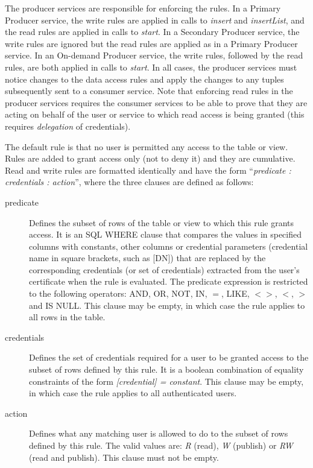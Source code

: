 The producer services are responsible for enforcing the rules. In a Primary
Producer service, the write rules are applied in calls to \textit{insert} and
\textit{insertList}, and the read rules are applied in calls to \textit{start}.
In a Secondary Producer service, the write rules are ignored but the read rules
are applied as in a Primary Producer service. In an On-demand Producer service,
the write rules, followed by the read rules, are both applied in calls to
\textit{start}. In all cases, the producer services must
notice changes to the data access rules
and apply the changes to any tuples subsequently sent to a consumer service.
Note that enforcing read rules in the producer services requires the consumer
services to be able to prove that they are acting on behalf of the user or
service to which read access is being granted (this requires \textit{delegation}
of credentials).

The default rule is that no user is permitted any access to the table or view.
Rules are added to grant access only (not to deny it) and they are cumulative.
Read and write rules are formatted identically and have
the form ``\textit{predicate : credentials : action}'', where the three
clauses are defined as follows:

\begin{description}

\item[predicate]
Defines the subset of rows of the table or view to which this rule grants
access. It is an SQL WHERE clause that compares the values in specified
columns with constants, other columns or credential parameters (credential
name in square brackets, such as [DN]) that are replaced by the corresponding
credentials (or set of credentials) extracted from the user's certificate when
the rule is evaluated. The predicate expression is restricted to the following
operators: AND, OR, NOT, IN, \(=\), LIKE, \(<>\), \(<\), \(>\) and IS
NULL. This clause may be empty, in which case the rule applies to all rows in
the table.

\item[credentials]
Defines the set of credentials required for a user to be granted access to
the subset of rows defined by this rule. It is a boolean combination of
equality constraints of the form \textit{[credential] = constant}. This
clause may be empty, in which case the rule applies to all authenticated
users.

\item[action]
Defines what any matching user is allowed to do to the subset of rows defined
by this rule. The valid values are: \textit{R} (read), \textit{W} (publish) or
\textit{RW} (read and publish). This clause must not be empty.

\end{description}

